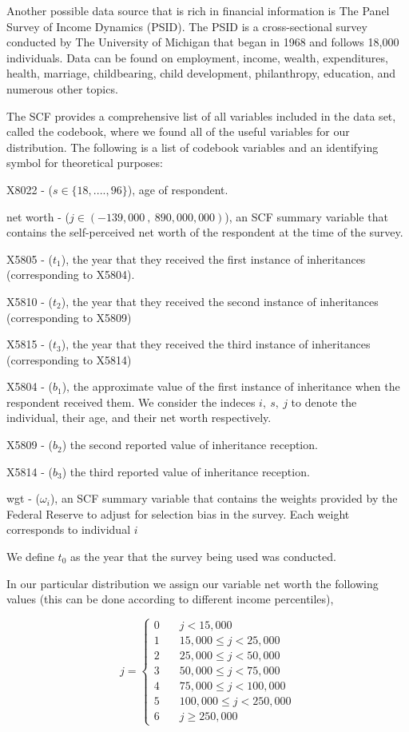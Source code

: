 \documentclass[letterpaper,12pt]{article}
\theoremstyle{definition}
\begin{document}
\begin{spacing}{1.5}
Another possible data source that is rich in financial information is The Panel Survey of Income Dynamics (PSID). The PSID is a cross-sectional survey conducted by The University of Michigan that began in 1968 and follows 18,000 individuals. Data can be found on employment, income, wealth, expenditures, health, marriage, childbearing, child development, philanthropy, education, and numerous other topics. \citet{UMich}

The SCF provides a comprehensive list of all variables included in the data set, called the codebook, where we found all of the useful variables for our distribution. The following is a list of codebook variables and an identifying symbol for theoretical purposes:

  X8022 - ($s \in \{18,....,96\}$), age of respondent.

  net worth - ($j\in (-139,000~,~890,000,000)$), an SCF summary variable that contains the self-perceived net worth of the respondent at the time of the survey.

  X5805 - ($t_1$), the year that they received the first instance of inheritances (corresponding to X5804).

  X5810 - ($t_2$), the year that they received the second instance of inheritances (corresponding to X5809)

  X5815 - ($t_3$), the year that they received the third instance of inheritances (corresponding to X5814)

  X5804 - ($b_{1}$), the approximate value of the first instance of inheritance when the respondent received them. We consider the indeces $i,~s,~j$ to denote the individual, their age, and their net worth respectively.

  X5809 - ($b_{2}$) the second reported value of inheritance reception.

  X5814 - ($b_{3}$) the third reported value of inheritance reception.
  
  wgt - ($\omega_i$), an SCF summary variable that contains the weights provided by the Federal Reserve to adjust for selection bias in the survey. Each weight corresponds to individual $i$

  We define $t_0$ as the year that the survey being used was conducted.

  In our particular distribution we assign our variable net worth the following values (this can be done according to different income percentiles),


  \[ j = \left\{
        \begin{array}{ll}
            0 & \quad j < 15,000 \\
            1 & \quad 15,000 \leq j <25,000 \\
            2& \quad 25,000 \leq j <50,000 \\
            3 & \quad 50,000 \leq j <75,000\\
            4 & \quad 75,000 \leq j <100,000 \\
            5 & \quad 100,000 \leq j <250,000\\
            6 & \quad j \geq 250,000 
        \end{array}
    \right. \]




\end{spacing}
\end{document}
